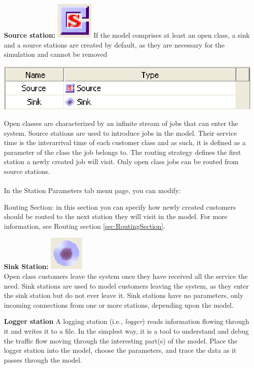 \begin{enumerate*}
\item \textbf{Source station:}
\includegraphics[scale=0.5]{img/jsim/source.eps}
If the model comprises at least an open class, a sink and  a source stations are created by default, as they are necessary for the simulation and cannot be removed\\
\begin{center}
\includegraphics[scale=.5]{img/jsim/source_sink.eps}
\end{center}
Open classes are characterized by an infinite stream of jobs that can enter the system. Source stations are used to introduce jobs in the model. Their service time is the interarrival time of each customer class and as such, it is defined as a parameter of the class the job belongs to. The routing strategy defines the first station
a newly created job will visit. Only open class jobs can be routed from source stations.\\\\
In the Station Parameters tab menu page, you can modify:
\begin{description*}
\item[Routing Section:] in this section you can specify how newly
created customers should be routed to the next station they will
visit in the model. For more information, see Routing section
\autoref{sec:RoutingSection}.
\end{description*}
\item \textbf{Sink Station:} \includegraphics[scale=0.5]{img/jsim/sink.eps}\\
Open class customers leave the system once they have received all
the service the need. Sink stations are used to model customers
leaving the system, as they enter the sink station but do not ever
leave it. Sink stations have no parameters, only incoming
connections from one or more stations, depending upon the model.
\item \textbf{Logger station}
A logging station (i.e., \emph{logger}) reads information
flowing through it and writes it to a file.   In the simplest way,
it is a tool to understand and debug the traffic flow moving
through the interesting part(s) of the model. Place the logger
station into the model, choose the parameters, and trace the data
as it passes through the model.\\


\end{enumerate*}
